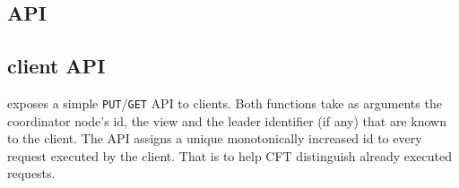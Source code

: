 




\subsection{\projecttitle{} API}

\subsection{\projecttitle{} client API}
\projecttitle{} exposes a simple \texttt{PUT}/\texttt{GET} API to clients. Both functions take as arguments the coordinator node's id, the view and the leader identifier (if any) that are known to the client. The API assigns a unique monotonically increased id to every request executed by the client. That is to help CFT distinguish already executed requests.
\fi

